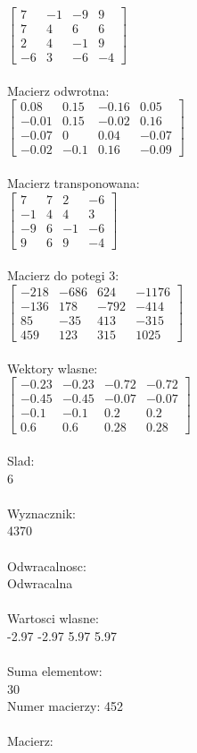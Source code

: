 \documentclass[a4paper,12pt]{article}
\begin{document}
$\begin{bmatrix} 7&-1&-9&9\\7&4&6&6\\2&4&-1&9\\-6&3&-6&-4 \end{bmatrix}$
\\
\\
Macierz odwrotna:\\

$\begin{bmatrix} 0.08&0.15&-0.16&0.05\\-0.01&0.15&-0.02&0.16\\-0.07&0&0.04&-0.07\\-0.02&-0.1&0.16&-0.09 \end{bmatrix}$
\\
\\
Macierz transponowana:\\

$\begin{bmatrix} 7&7&2&-6\\-1&4&4&3\\-9&6&-1&-6\\9&6&9&-4 \end{bmatrix}$
\\
\\
Macierz do potegi 3:\\

$\begin{bmatrix} -218&-686&624&-1176\\-136&178&-792&-414\\85&-35&413&-315\\459&123&315&1025 \end{bmatrix}$
\\
\\
Wektory wlasne:\\

$\begin{bmatrix} -0.23&-0.23&-0.72&-0.72\\-0.45&-0.45&-0.07&-0.07\\-0.1&-0.1&0.2&0.2\\0.6&0.6&0.28&0.28 \end{bmatrix}$
\\
\\
Slad:\\
6
\\
\\
Wyznacznik:\\
4370
\\
\\
Odwracalnosc:\\
Odwracalna
\\
\\
Wartosci wlasne:\\
-2.97 -2.97 5.97 5.97
\\
\\
Suma elementow:\\
30
\\
\newpage
Numer macierzy:
452
\\
\\
Macierz:\\
\end{document}
